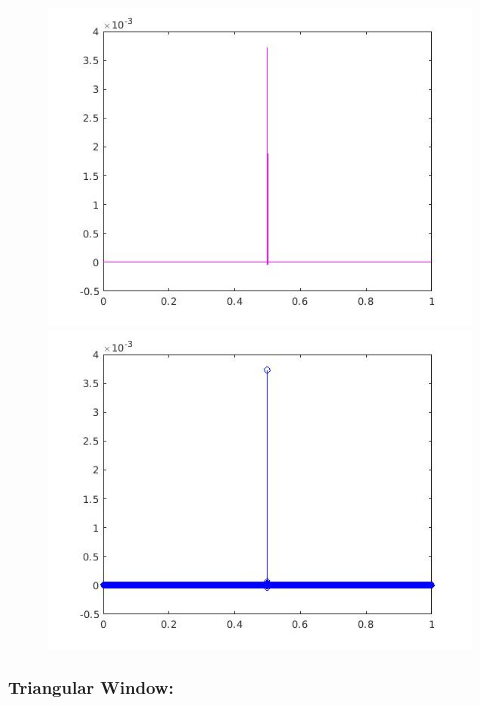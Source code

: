 \documentclass[a4paper,11pt]{article}
\begin{document}
\begin{figure}[!hp]
\centering
\begin{minipage}{.5\textwidth}
  \centering
  \includegraphics[width=1\linewidth]{images/lab2_59.jpg}
\end{minipage}%
\begin{minipage}{.5\textwidth}
  \centering
  \includegraphics[width=1\linewidth]{images/lab2_60.jpg}
\end{minipage}
\end{figure}

\newpage

\subsubsection{Triangular Window:}
\end{document}
